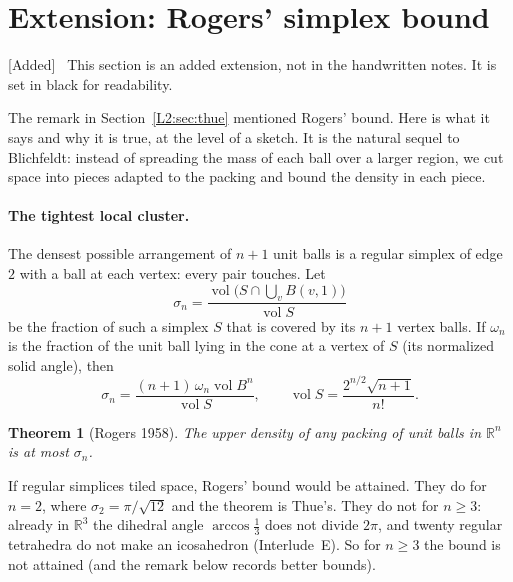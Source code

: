 \documentclass[11pt,openany]{book}
\theoremstyle{plain}
\newtheorem{theorem}{Theorem}[chapter]
\theoremstyle{definition}
\theoremstyle{remark}
\newenvironment{addedblock}{\par\color{addcol}\noindent\textsf{\small[Added]}\ }{\par}
\newcommand{\R}{\mathbb{R}}
\newcommand{\vol}{\operatorname{vol}}
\newcommand{\Ball}{B}                  %
\begin{document}
\section{Extension: Rogers' simplex bound}
\label{L2:sec:rogers}

\begin{addedblock}
This section is an added extension, not in the handwritten notes. It is set in black for readability.
\end{addedblock}

The remark in Section~\ref{L2:sec:thue} mentioned Rogers' bound. Here is what it says and why it is
true, at the level of a sketch. It is the natural sequel to Blichfeldt: instead of spreading the mass of
each ball over a larger region, we cut space into pieces adapted to the packing and bound the density
in each piece.

\paragraph{The tightest local cluster.} The densest possible arrangement of $n+1$ unit balls is a
regular simplex of edge $2$ with a ball at each vertex: every pair touches. Let
\[
  \sigma_n=\frac{\vol\big(S\cap\bigcup_{v}\Ball(v,1)\big)}{\vol S}
\]
be the fraction of such a simplex $S$ that is covered by its $n+1$ vertex balls. If $\omega_n$ is the
fraction of the unit ball lying in the cone at a vertex of $S$ (its normalized solid angle), then
\[
  \sigma_n=\frac{(n+1)\,\omega_n\vol\Ball^n}{\vol S},\qquad \vol S=\frac{2^{n/2}\sqrt{n+1}}{n!}.
\]

\begin{theorem}[Rogers 1958]\label{L2:thm:rogers}
The upper density of any packing of unit balls in $\R^n$ is at most $\sigma_n$.
\end{theorem}

If regular simplices tiled space, Rogers' bound would be attained. They do for $n=2$, where
$\sigma_2=\pi/\sqrt{12}$ and the theorem is Thue's. They do not for $n\ge3$: already in $\R^3$ the
dihedral angle $\arccos\frac13$ does not divide $2\pi$, and twenty regular tetrahedra do not make an
icosahedron (Interlude~E). So for $n\ge3$ the bound is not attained (and the remark below records
better bounds).
\end{document}
